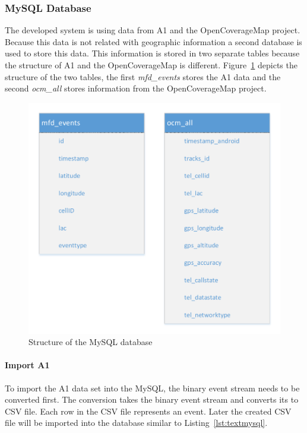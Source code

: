 \documentclass[master,english]{hgbthesis}
\begin{document}
\subsubsection{MySQL Database}
The developed system is using data from A1 and the OpenCoverageMap project. Because this data is not related with geographic information a second database is used to store this data. This information is stored in two separate tables because the structure of A1 and the OpenCoverageMap is different. Figure~\ref{fig:mysql_structure} depicts the structure of the two tables, the first \emph{mfd_events} stores the A1 data and the second \emph{ocm_all} stores information from the OpenCoverageMap project.
\begin{figure}
\centering
\includegraphics[width=0.7\linewidth]{./images/mysql_structure}
\caption{Structure of the MySQL database}
\label{fig:mysql_structure}
\end{figure}
\paragraph{Import A1}
To import the A1 data set into the MySQL, the binary event stream needs to be converted first. The conversion takes the binary event stream and converts its to CSV file. Each row in the CSV file represents an event. Later the created CSV file will be imported into the database similar to Listing~\ref{lst:textmysql}.
\end{document}
